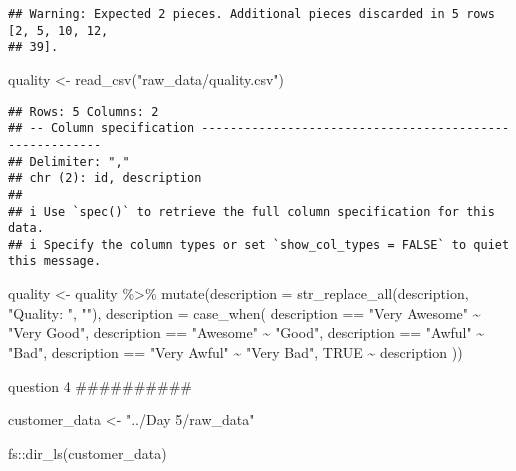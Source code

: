 \documentclass[
]{article}
\newenvironment{Shaded}{\begin{snugshade}}{\end{snugshade}}
\newcommand{\AttributeTok}[1]{\textcolor[rgb]{0.77,0.63,0.00}{#1}}
\newcommand{\ConstantTok}[1]{\textcolor[rgb]{0.00,0.00,0.00}{#1}}
\newcommand{\FunctionTok}[1]{\textcolor[rgb]{0.00,0.00,0.00}{#1}}
\newcommand{\NormalTok}[1]{#1}
\newcommand{\OtherTok}[1]{\textcolor[rgb]{0.56,0.35,0.01}{#1}}
\newcommand{\SpecialCharTok}[1]{\textcolor[rgb]{0.00,0.00,0.00}{#1}}
\newcommand{\StringTok}[1]{\textcolor[rgb]{0.31,0.60,0.02}{#1}}
\begin{document}
\begin{verbatim}
## Warning: Expected 2 pieces. Additional pieces discarded in 5 rows [2, 5, 10, 12,
## 39].
\end{verbatim}

\begin{Shaded}
\begin{Highlighting}[]
\NormalTok{quality }\OtherTok{\textless{}{-}} \FunctionTok{read\_csv}\NormalTok{(}\StringTok{"raw\_data/quality.csv"}\NormalTok{)}
\end{Highlighting}
\end{Shaded}

\begin{verbatim}
## Rows: 5 Columns: 2
## -- Column specification --------------------------------------------------------
## Delimiter: ","
## chr (2): id, description
## 
## i Use `spec()` to retrieve the full column specification for this data.
## i Specify the column types or set `show_col_types = FALSE` to quiet this message.
\end{verbatim}

\begin{Shaded}
\begin{Highlighting}[]
\NormalTok{quality }\OtherTok{\textless{}{-}}\NormalTok{ quality }\SpecialCharTok{\%\textgreater{}\%} 
  \FunctionTok{mutate}\NormalTok{(}\AttributeTok{description =} \FunctionTok{str\_replace\_all}\NormalTok{(description, }\StringTok{"Quality: "}\NormalTok{, }\StringTok{""}\NormalTok{),}
         \AttributeTok{description =} \FunctionTok{case\_when}\NormalTok{(}
\NormalTok{           description }\SpecialCharTok{==} \StringTok{"Very Awesome"} \SpecialCharTok{\textasciitilde{}} \StringTok{"Very Good"}\NormalTok{,}
\NormalTok{           description }\SpecialCharTok{==} \StringTok{"Awesome"} \SpecialCharTok{\textasciitilde{}} \StringTok{"Good"}\NormalTok{,}
\NormalTok{           description }\SpecialCharTok{==} \StringTok{"Awful"} \SpecialCharTok{\textasciitilde{}} \StringTok{"Bad"}\NormalTok{,}
\NormalTok{           description }\SpecialCharTok{==} \StringTok{"Very Awful"} \SpecialCharTok{\textasciitilde{}} \StringTok{"Very Bad"}\NormalTok{,}
           \ConstantTok{TRUE} \SpecialCharTok{\textasciitilde{}}\NormalTok{ description}
\NormalTok{         ))}
\end{Highlighting}
\end{Shaded}

question 4 \#\#\#\#\#\#\#\#\#\#

\begin{Shaded}
\begin{Highlighting}[]
\NormalTok{customer\_data }\OtherTok{\textless{}{-}} \StringTok{"../Day 5/raw\_data"}

\NormalTok{fs}\SpecialCharTok{::}\FunctionTok{dir\_ls}\NormalTok{(customer\_data)}
\end{Highlighting}
\end{Shaded}
\end{document}
